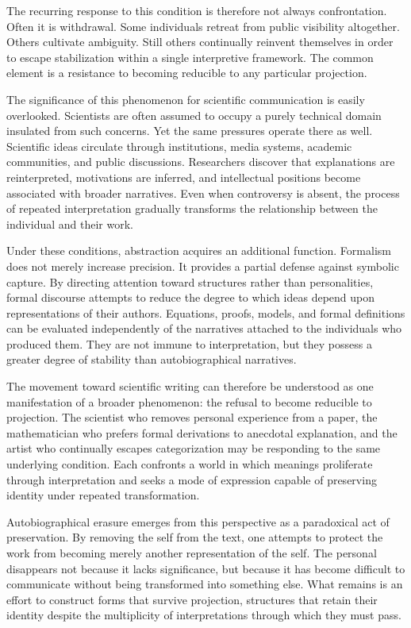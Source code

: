 \documentclass[11pt]{article}
\theoremstyle{plain}
\begin{document}
The recurring response to this condition is therefore not always confrontation. Often it is withdrawal. Some individuals retreat from public visibility altogether. Others cultivate ambiguity. Still others continually reinvent themselves in order to escape stabilization within a single interpretive framework. The common element is a resistance to becoming reducible to any particular projection.

The significance of this phenomenon for scientific communication is easily overlooked. Scientists are often assumed to occupy a purely technical domain insulated from such concerns. Yet the same pressures operate there as well. Scientific ideas circulate through institutions, media systems, academic communities, and public discussions. Researchers discover that explanations are reinterpreted, motivations are inferred, and intellectual positions become associated with broader narratives. Even when controversy is absent, the process of repeated interpretation gradually transforms the relationship between the individual and their work.

Under these conditions, abstraction acquires an additional function. Formalism does not merely increase precision. It provides a partial defense against symbolic capture. By directing attention toward structures rather than personalities, formal discourse attempts to reduce the degree to which ideas depend upon representations of their authors. Equations, proofs, models, and formal definitions can be evaluated independently of the narratives attached to the individuals who produced them. They are not immune to interpretation, but they possess a greater degree of stability than autobiographical narratives.

The movement toward scientific writing can therefore be understood as one manifestation of a broader phenomenon: the refusal to become reducible to projection. The scientist who removes personal experience from a paper, the mathematician who prefers formal derivations to anecdotal explanation, and the artist who continually escapes categorization may be responding to the same underlying condition. Each confronts a world in which meanings proliferate through interpretation and seeks a mode of expression capable of preserving identity under repeated transformation.

Autobiographical erasure emerges from this perspective as a paradoxical act of preservation. By removing the self from the text, one attempts to protect the work from becoming merely another representation of the self. The personal disappears not because it lacks significance, but because it has become difficult to communicate without being transformed into something else. What remains is an effort to construct forms that survive projection, structures that retain their identity despite the multiplicity of interpretations through which they must pass.
\end{document}

